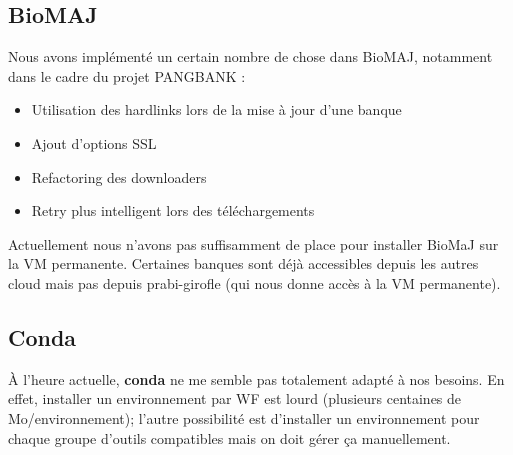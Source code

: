 \subsection{BioMAJ}

Nous avons implémenté un certain nombre de chose dans BioMAJ, notamment dans le cadre du projet PANGBANK :
\begin{itemize}
    \item Utilisation des hardlinks lors de la mise à jour d'une banque
    \item Ajout d'options SSL
    \item Refactoring des downloaders
    \item Retry plus intelligent lors des téléchargements
\end{itemize}
\bigskip

Actuellement nous n'avons pas suffisamment de place pour installer BioMaJ sur la VM permanente.
Certaines banques sont déjà accessibles depuis les autres cloud mais pas depuis prabi-girofle (qui nous donne accès à la VM permanente).

\subsection{Conda}
À l'heure actuelle, \textbf{conda} ne me semble pas totalement adapté à nos besoins.
En effet, installer un environnement par WF est lourd (plusieurs centaines de Mo/environnement); l'autre possibilité est d'installer un environnement pour chaque groupe d'outils compatibles mais on doit gérer ça manuellement.
